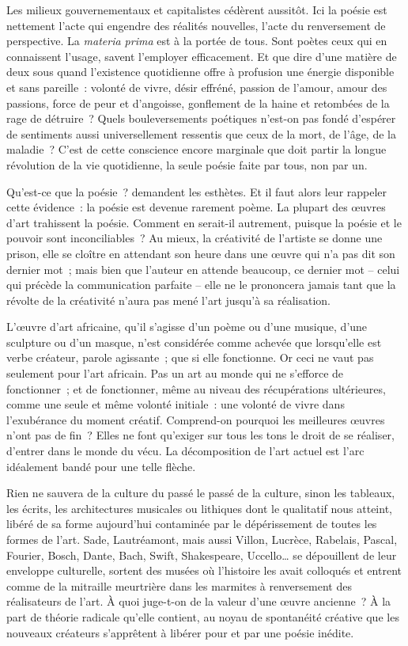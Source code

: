 \documentclass[french,twoside]{book} %
\begin{document}
\noindent Les milieux gouvernementaux et capitalistes cédèrent aussitôt. Ici la poésie est nettement l’acte qui engendre des réalités nouvelles, l’acte du renversement de perspective. La \emph{materia prima} est à la portée de tous. Sont poètes ceux qui en connaissent l’usage, savent l’employer efficacement. Et que dire d’une matière de deux sous quand l’existence quotidienne offre à profusion une énergie disponible et sans pareille : volonté de vivre, désir effréné, passion de l’amour, amour des passions, force de peur et d’angoisse, gonflement de la haine et retombées de la rage de détruire ? Quels bouleversements poétiques n’est-on pas fondé d’espérer de sentiments aussi universellement ressentis que ceux de la mort, de l’âge, de la maladie ? C’est de cette conscience encore marginale que doit partir la longue révolution de la vie quotidienne, la seule poésie faite par tous, non par un.\par
Qu’est-ce que la poésie ? demandent les esthètes. Et il faut alors leur rappeler cette évidence : la poésie est devenue rarement poème. La plupart des œuvres d’art trahissent la poésie. Comment en serait-il autrement, puisque la poésie et le pouvoir sont inconciliables ? Au mieux, la créativité de l’artiste se donne une prison, elle se cloître en attendant son heure dans une œuvre qui n’a pas dit son dernier mot ; mais bien que l’auteur en attende beaucoup, ce dernier mot – celui qui précède la communication parfaite – elle ne le prononcera jamais tant que la révolte de la créativité n’aura pas mené l’art jusqu’à sa réalisation.\par
L’œuvre d’art africaine, qu’il s’agisse d’un poème ou d’une musique, d’une sculpture ou d’un masque, n’est considérée comme achevée que lorsqu’elle est verbe créateur, parole agissante ; que si elle fonctionne. Or ceci ne vaut pas seulement pour l’art africain. Pas un art au monde qui ne s’efforce de fonctionner ; et de fonctionner, même au niveau des récupérations ultérieures, comme une seule et même volonté initiale : une volonté de vivre dans l’exubérance du moment créatif. Comprend-on pourquoi les meilleures œuvres n’ont pas de fin ? Elles ne font qu’exiger sur tous les tons le droit de se réaliser, d’entrer dans le monde du vécu. La décomposition de l’art actuel est l’arc idéalement bandé pour une telle flèche.\par
Rien ne sauvera de la culture du passé le passé de la culture, sinon les tableaux, les écrits, les architectures musicales ou lithiques dont le qualitatif nous atteint, libéré de sa forme aujourd’hui contaminée par le dépérissement de toutes les formes de l’art. Sade, Lautréamont, mais aussi Villon, Lucrèce, Rabelais, Pascal, Fourier, Bosch, Dante, Bach, Swift, Shakespeare, Uccello… se dépouillent de leur enveloppe culturelle, sortent des musées où l’histoire les avait colloqués et entrent comme de la mitraille meurtrière dans les marmites à renversement des réalisateurs de l’art. À quoi juge-t-on de la valeur d’une œuvre ancienne ? À la part de théorie radicale qu’elle contient, au noyau de spontanéité créative que les nouveaux créateurs s’apprêtent à libérer pour et par une poésie inédite.\par
\end{document}
